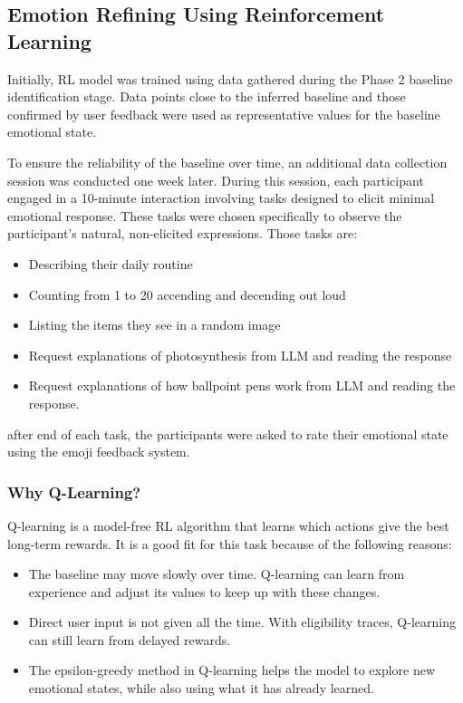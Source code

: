 \subsection{Emotion Refining Using Reinforcement Learning}

Initially, RL model was trained using data gathered during the Phase 2 baseline identification stage. Data points close to the inferred baseline and those confirmed by user feedback were used as representative values for the baseline emotional state.

\par\label{par:refineing-tasks} To ensure the reliability of the baseline over time, an additional data collection session was conducted one week later. During this session, each participant engaged in a 10-minute interaction involving tasks designed to elicit minimal emotional response. These tasks were chosen specifically to observe the participant’s natural, non-elicited expressions. Those tasks are:

\begin{itemize}
  \item Describing their daily routine
  \item Counting from 1 to 20 accending and decending out loud
  \item Listing the items they see in a random image
  \item Request explanations of photosynthesis from LLM and reading the response
  \item Request explanations of how ballpoint pens work from LLM and reading the response.
\end{itemize}

after end of each task, the participants were asked to rate their emotional state using the emoji feedback system.


\subsubsection*{Why Q-Learning?}

Q-learning is a model-free RL algorithm that learns which actions give the best long-term rewards. It is a good fit for this task because of the following reasons:

\begin{itemize}
    \item The baseline may move slowly over time. Q-learning can learn from experience and adjust its values to keep up with these changes.
    \item Direct user input is not given all the time. With eligibility traces, Q-learning can still learn from delayed rewards.
    \item The epsilon-greedy method in Q-learning helps the model to explore new emotional states, while also using what it has already learned.
\end{itemize}

